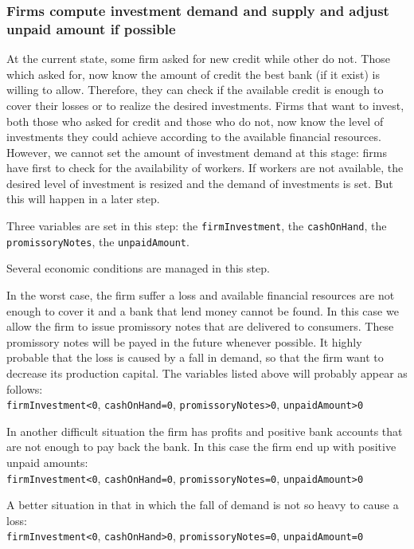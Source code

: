\documentclass{book}
\begin{document}
\subsubsection{Firms compute investment demand and supply and adjust unpaid amount if possible}
At the current state, some firm asked for new credit while other do not. 
Those which asked for, now know the amount of credit the best bank (if it exist) is willing to allow.
Therefore, they can check if the available credit is enough to cover their losses or to realize the desired investments. 
Firms that want to invest, both those who asked for credit and those who do not, now know the level of investments they could achieve according to the available financial resources. However, we cannot set the amount of investment demand at this stage: firms have first to check for the availability of workers. If workers are not available, the desired level of investment is resized and the demand of investments is set. But this will happen in a later step.

Three variables are set in this step: the \verb+firmInvestment+, the \verb+cashOnHand+, the \verb+promissoryNotes+, the \verb+unpaidAmount+.

Several economic conditions are managed in this step. 

In the worst case, the firm suffer a loss and available financial resources are not enough to cover it and a bank that lend money cannot be found. In this case we allow the firm to issue promissory notes that are delivered to consumers. These promissory notes will be payed in the future whenever possible.
It highly probable that the loss is caused by a fall in demand, so that the firm want to decrease its production capital. 
The variables listed above will probably appear as follows:\\
\verb+firmInvestment<0+, \verb+cashOnHand=0+, \verb+promissoryNotes>0+, \verb+unpaidAmount>0+

In another difficult situation the firm has profits and positive bank accounts that are not enough to pay back the bank. In this case the firm end up with positive unpaid amounts:\\
\verb+firmInvestment<0+, \verb+cashOnHand=0+, \verb+promissoryNotes=0+, \verb+unpaidAmount>0+

A better situation in that in which the fall of demand is not so heavy to cause a loss:\\
\verb+firmInvestment<0+, \verb+cashOnHand>0+, \verb+promissoryNotes=0+, \verb+unpaidAmount=0+
\end{document}
